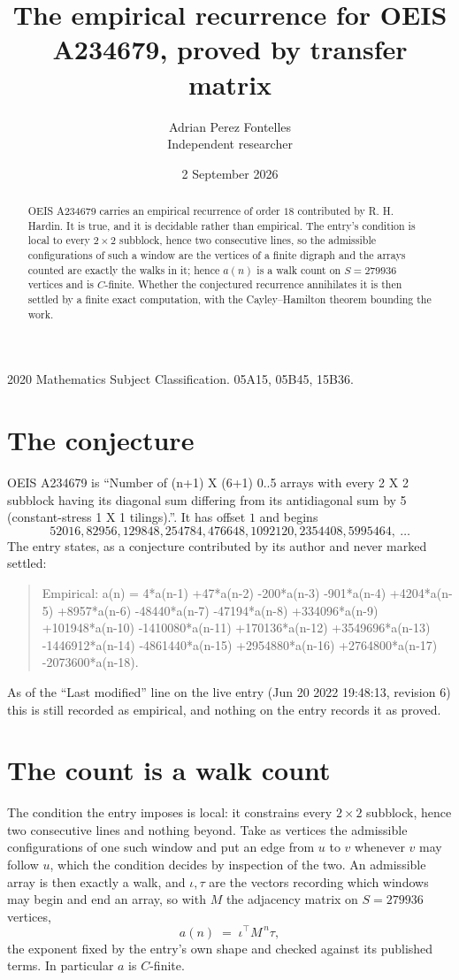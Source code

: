 \documentclass[11pt,a4paper]{article}
\title{The empirical recurrence for OEIS A234679, proved by transfer matrix}
\author{Adrian Perez Fontelles\\ \small Independent researcher}
\date{2 September 2026}
\theoremstyle{plain}
\theoremstyle{definition}
\begin{document}
\maketitle

\begin{abstract}
OEIS A234679 carries an empirical recurrence of order $18$ contributed by R. H. Hardin. It is
true, and it is decidable rather than empirical. The entry's condition is local to every $2\times2$ subblock, hence two consecutive lines, so
the admissible configurations of such a window are the vertices of a finite digraph and the
arrays counted are exactly the walks in it; hence $a(n)$ is a walk count on $S=279936$ vertices
and is $C$-finite. Whether the conjectured recurrence annihilates it is then settled by a
finite exact computation, with the Cayley--Hamilton theorem bounding the work.
\end{abstract}

\noindent\small 2020 Mathematics Subject Classification. 05A15, 05B45, 15B36.\normalsize

\section{The conjecture}

OEIS A234679 is ``Number of (n+1) X (6+1) 0..5 arrays with every 2 X 2 subblock having its diagonal sum differing from its antidiagonal sum by 5 (constant-stress 1 X 1 tilings).''. It has offset $1$ and begins
\[
52016, 82956, 129848, 254784, 476648, 1092120, 2354408, 5995464,\ \dots
\]
The entry states, as a conjecture contributed by its author and never marked settled:
\begin{quote}
Empirical: a(n) = 4*a(n-1) +47*a(n-2) -200*a(n-3) -901*a(n-4) +4204*a(n-5) +8957*a(n-6) -48440*a(n-7) -47194*a(n-8) +334096*a(n-9) +101948*a(n-10) -1410080*a(n-11) +170136*a(n-12) +3549696*a(n-13) -1446912*a(n-14) -4861440*a(n-15) +2954880*a(n-16) +2764800*a(n-17) -2073600*a(n-18).
\end{quote}
As of the ``Last modified'' line on the live entry (Jun 20 2022 19:48:13, revision 6) this is still
recorded as empirical, and nothing on the entry records it as proved.

\section{The count is a walk count}

The condition the entry imposes is local: it constrains every $2\times2$ subblock, hence two consecutive lines and nothing beyond. Take as vertices the admissible configurations of one such window and put an edge from $u$ to $v$ whenever $v$ may follow $u$, which the condition decides by inspection of the two.
An admissible array is then exactly a walk, and $\iota,\tau$ are the vectors recording which windows may begin and end an array, so with $M$ the adjacency matrix on $S=279936$ vertices,
\[
a(n)\;=\;\iota^{\!\top}M^{\,n}\tau ,
\]
the exponent fixed by the entry's own shape and checked against its published terms. In
particular $a$ is $C$-finite.
\end{document}
